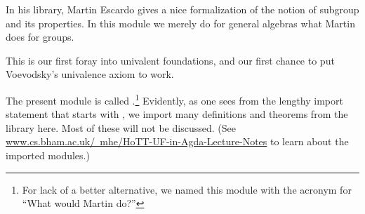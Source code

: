 In his \TypeTopology library, Martin Escardo gives a nice formalization of the notion of subgroup and its properties. In this module we merely do for general algebras what Martin does for groups.

This is our first foray into univalent foundations, and our first chance to put Voevodsky's univalence axiom to work.

The present module is called .\footnote{For lack of a better alternative, we named this module with the acronym for ``What would Martin do?''} Evidently, as one sees from the lengthy import statement that starts with   , we import many definitions and theorems from the \TypeTopology library here. Most of these will not be discussed. (See \href{https://www.cs.bham.ac.uk/~mhe/HoTT-UF-in-Agda-Lecture-Notes/index.html}{www.cs.bham.ac.uk/~mhe/HoTT-UF-in-Agda-Lecture-Notes} to learn about the imported modules.)

